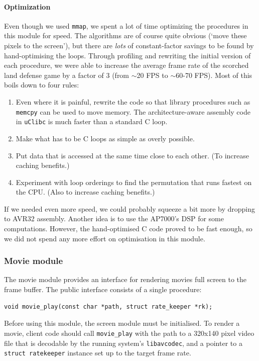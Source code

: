 \documentclass[a4paper,10pt]{article}
\newcommand{\isrc}[1]{\texttt{#1}}
\begin{document}
\paragraph{Optimization}
Even though we used \isrc{mmap}, we spent a lot of time optimizing the
procedures in this module for speed. The algorithms are of course quite
obvious (`move these pixels to the screen'), but there are \emph{lots} of
constant-factor savings to be found by hand-optimising the loops. Through
profiling and rewriting the initial version of each procedure, we were able to
increase the average frame rate of the scorched land defense game by a factor
of 3 (from $\sim$20 FPS to $\sim$60-70 FPS). Most of this boils down to four
rules: 
\begin{enumerate}
    \item Even where it is painful, rewrite the code so that library
        procedures such as \isrc{memcpy} can be used to move memory. The
        architecture-aware assembly code in \isrc{uClibc} is much faster than a
        standard C loop. 
    \item Make what has to be C loops as simple as overly possible. 
    \item Put data that is accessed at the same time close to each other. (To
        increase caching benefits.) 
    \item Experiment with loop orderings to find the permutation that runs
        fastest on the CPU. (Also to increase caching benefits.)
\end{enumerate}
If we needed even more speed, we could probably squeeze a bit more by dropping
to AVR32 assembly. Another idea is to use the AP7000's DSP for some
computations. However, the
hand-optimised C code proved to be fast enough, so we did not spend any more
effort on optimisation in this module. 

\subsubsection{Movie module}
The movie module provides an interface for rendering movies full screen
to the frame buffer.
The public interface consists of a single procedure:
\begin{lstlisting}
void movie_play(const char *path, struct rate_keeper *rk);
\end{lstlisting}
Before using this module, the screen module must be initialised.
To render a movie, client code should call \isrc{movie\_play} with the path
to a 320x140 pixel video file that is decodable by the running system's
\texttt{libavcodec}, and a pointer to a \isrc{struct ratekeeper} instance set
up to the target frame rate.
\end{document}

